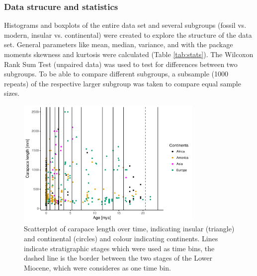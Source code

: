 \subsubsection{Data strucure and statistics}
Histograms and boxplots of the entire data set and several subgroups (fossil vs. modern, insular vs. continental) were created to explore the structure of the data set. General parameters like mean, median, variance, and with the package moments \citep{Komsta2015} skewness and kurtosis were calculated (Table \ref{tab:stats}). The Wilcoxon Rank Sum Test (unpaired data) was used to test for differences between two subgroups. To be able to compare different subgroups, a subsample (1000 repeats) of the respective larger subgroup was taken to compare equal sample sizes. 


\begin{figure}[htbp]
	\centering
	\includegraphics[width=0.8\textwidth]{MA_JJ_files/figure-latex/overviewData-1.pdf}
	\caption[Carapace length over time]{Scatterplot of carapace length over time, indicating insular
		(triangle) and continental (circles) and colour indicating continents.
		Lines indicate stratigraphic stages which were used as time bins, the
		dashed line is the border between the two stages of the Lower Miocene,
		which were consideres as one time bin.}
	\label{fig:bins}
\end{figure}





